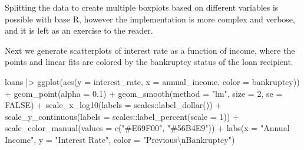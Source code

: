 \documentclass[12pt]{article}
\newenvironment{Shaded}{\begin{snugshade}}{\end{snugshade}}
\newcommand{\AttributeTok}[1]{\textcolor[rgb]{0.77,0.63,0.00}{#1}}
\newcommand{\ConstantTok}[1]{\textcolor[rgb]{0.00,0.00,0.00}{#1}}
\newcommand{\DecValTok}[1]{\textcolor[rgb]{0.00,0.00,0.81}{#1}}
\newcommand{\FloatTok}[1]{\textcolor[rgb]{0.00,0.00,0.81}{#1}}
\newcommand{\FunctionTok}[1]{\textcolor[rgb]{0.00,0.00,0.00}{#1}}
\newcommand{\NormalTok}[1]{#1}
\newcommand{\SpecialCharTok}[1]{\textcolor[rgb]{0.00,0.00,0.00}{#1}}
\newcommand{\StringTok}[1]{\textcolor[rgb]{0.31,0.60,0.02}{#1}}
\begin{document}
\label{ggplot-ex2} \linespread{2}
\vspace{3mm}\setlength{\parindent}{15pt}

Splitting the data to create multiple boxplots based on different
variables is possible with base R, however the implementation is more
complex and verbose, and it is left as an exercise to the reader.

Next we generate scatterplots of interest rate as a function of income,
where the points and linear fits are colored by the bankruptcy status of
the loan recipient.

\linespread{1}

\begin{Shaded}
\begin{Highlighting}[]
\NormalTok{loans }\SpecialCharTok{|\textgreater{}}
  \FunctionTok{ggplot}\NormalTok{(}\FunctionTok{aes}\NormalTok{(}\AttributeTok{y =}\NormalTok{ interest\_rate, }\AttributeTok{x =}\NormalTok{ annual\_income, }\AttributeTok{color =}\NormalTok{ bankruptcy)) }\SpecialCharTok{+}
  \FunctionTok{geom\_point}\NormalTok{(}\AttributeTok{alpha =} \FloatTok{0.1}\NormalTok{) }\SpecialCharTok{+} 
  \FunctionTok{geom\_smooth}\NormalTok{(}\AttributeTok{method =} \StringTok{"lm"}\NormalTok{, }\AttributeTok{size =} \DecValTok{2}\NormalTok{, }\AttributeTok{se =} \ConstantTok{FALSE}\NormalTok{) }\SpecialCharTok{+} 
  \FunctionTok{scale\_x\_log10}\NormalTok{(}\AttributeTok{labels =}\NormalTok{ scales}\SpecialCharTok{::}\FunctionTok{label\_dollar}\NormalTok{()) }\SpecialCharTok{+}
  \FunctionTok{scale\_y\_continuous}\NormalTok{(}\AttributeTok{labels =}\NormalTok{ scales}\SpecialCharTok{::}\FunctionTok{label\_percent}\NormalTok{(}\AttributeTok{scale =} \DecValTok{1}\NormalTok{)) }\SpecialCharTok{+}
  \FunctionTok{scale\_color\_manual}\NormalTok{(}\AttributeTok{values =} \FunctionTok{c}\NormalTok{(}\StringTok{"\#E69F00"}\NormalTok{, }\StringTok{"\#56B4E9"}\NormalTok{)) }\SpecialCharTok{+}
  \FunctionTok{labs}\NormalTok{(}\AttributeTok{x =} \StringTok{"Annual Income"}\NormalTok{, }\AttributeTok{y =} \StringTok{"Interest Rate"}\NormalTok{, }
       \AttributeTok{color =} \StringTok{"Previous}\SpecialCharTok{\textbackslash{}n}\StringTok{Bankruptcy"}\NormalTok{)}
\end{Highlighting}
\end{Shaded}
\end{document}
